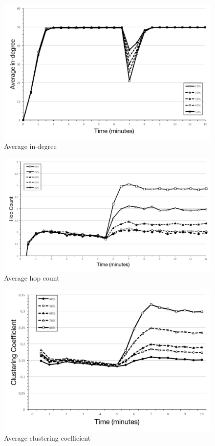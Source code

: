 \begin{figure}[ht]
  \centering
  \includegraphics[keepaspectratio=true, width=\textwidth]{images/average_indegree}\caption{Average in-degree}
  \label{fig:average_indegree}
\end{figure}

\begin{figure}[ht]
  \centering
  \includegraphics[keepaspectratio=true, width=\textwidth]{images/average_hop_count_failures}\caption{Average hop count}
  \label{fig:average_hop_count_failures}
\end{figure}

\begin{figure}[ht]
  \centering
  \includegraphics[keepaspectratio=true, width=\textwidth]{images/average_clustering_coefficient_failures}\caption{Average clustering coefficient}
  \label{fig:average_clustering_coefficient_failures}
\end{figure}

